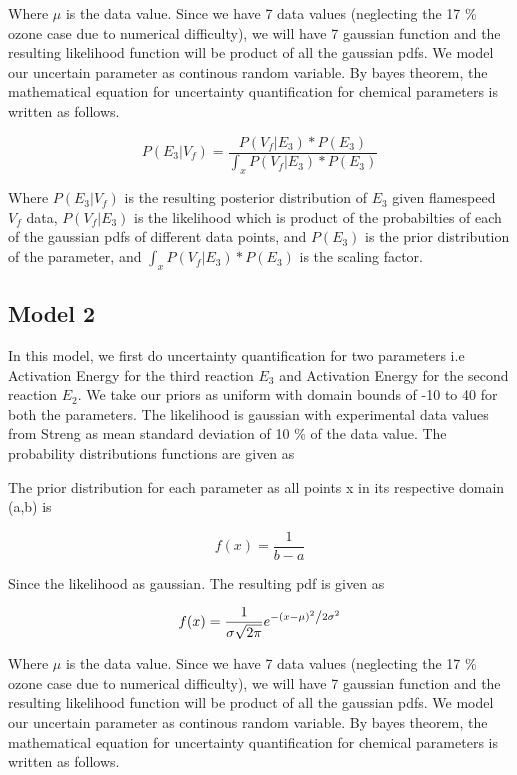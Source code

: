   
\noindent Where $\mu$ is the data value. Since we have 7 data values (neglecting the 17 \% ozone case due to numerical difficulty), we will have 7 gaussian function and the resulting likelihood function will be product of all the gaussian pdfs. We model our uncertain parameter as continous random variable. By bayes theorem, the mathematical equation for uncertainty quantification for chemical parameters is written as follows. 

 $$P( E_3 |V_f ) = \frac{P(V_f| E_3)*  P(E_3)}{\int_x P(V_f| E_3)* P(E_3)}$$ 
 
 \noindent Where  $P( E_3 |V_f ) $ is the resulting posterior distribution of $E_3$ given flamespeed $V_f$ data, $P(V_f| E_3)$ is the likelihood which is product of the probabilties of each of the gaussian pdfs of different data points, and $ P(E_3)$ is the prior distribution of the parameter, and $\int_x P(V_f|E_3)*P(E_3)$ is the scaling factor.
 

\subsection{Model 2}


\noindent In this model, we first do uncertainty quantification for two parameters i.e Activation Energy for the third reaction $E_3$ and Activation Energy for the second reaction $E_2$. We take our priors as uniform with domain bounds of -10 to 40 for both the parameters. The likelihood is gaussian with experimental data values from Streng\cite{Streng} as mean standard deviation of 10 \% of the data value. The probability distributions functions are given as

\nonident The prior distribution for each parameter as all points x in its respective domain (a,b) is 

$$f(x) = \frac{1}{b -a}$$


\noindent Since the likelihood as gaussian. The resulting pdf is given as 

$$f(x) = \frac{1}{{\sigma \sqrt {2\pi } }}e^{{{ - \left( {x - \mu } \right)^2 } \mathord{\left/ {\vphantom {{ - \left( {x - \mu } \right)^2 } {2\sigma ^2 }}} \right. \kern-\nulldelimiterspace} {2\sigma ^2 }}} $$

  
\noindent Where $\mu$ is the data value. Since we have 7 data values (neglecting the 17 \% ozone case due to numerical difficulty), we will have 7 gaussian function and the resulting likelihood function will be product of all the gaussian pdfs. We model our uncertain parameter as continous random variable. By bayes theorem, the mathematical equation for uncertainty quantification for chemical parameters is written as follows. 

